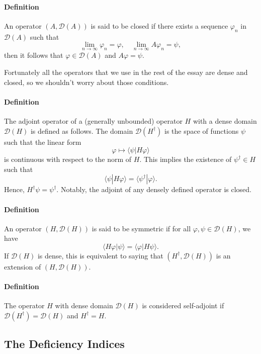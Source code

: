 \paragraph{Definition} An operator $(A, \mathcal{D}(A))$ is said to be closed if there exists a
sequence $\varphi_n$ in $\mathcal{D}(A)$ such that
\[
    \lim_{n \to \infty} \varphi_n = \varphi, \quad \lim_{n \to \infty} A\varphi_n = \psi,
\]
then it follows that $\varphi \in \mathcal{D}(A)$ and $A\varphi = \psi$.

Fortunately all the operators that we use in the rest of the essay are dense and closed, so we shouldn't worry about those conditions.

\paragraph{Definition} The adjoint operator of a (generally unbounded) operator $H$ with a dense
domain $\mathcal{D}(H)$ is defined as follows. The domain
$\mathcal{D}(H^\dagger)$ is the space of functions $\psi$ such that the linear
form
\[
    \varphi \mapsto \langle \psi| H\varphi \rangle
\]
is continuous with respect to the norm of $H$. This implies the existence of
$\psi^\dagger \in H$ such that
\[
    \langle\psi| H\varphi \rangle = \langle\psi^\dagger| \varphi \rangle .
\]
Hence, $H^\dagger\psi = \psi^\dagger$. Notably, the adjoint of any densely
defined operator is closed.

\paragraph{Definition} An operator $(H, \mathcal{D}(H))$ is said to be symmetric if for all $\varphi,
    \psi \in \mathcal{D}(H)$, we have
\[
    \langle H\varphi| \psi \rangle = \langle \varphi| H\psi \rangle.
\]
If $\mathcal{D}(H)$ is dense, this is equivalent to saying that $(H^\dagger,
    \mathcal{D}(H))$ is an extension of $(H, \mathcal{D}(H))$.

\paragraph{Definition} The operator $H$ with dense domain $\mathcal{D}(H)$ is considered self-adjoint
if $\mathcal{D}(H^\dagger) = \mathcal{D}(H)$ and $H^\dagger = H$.

\clearpage

\subsection{The Deficiency Indices}

